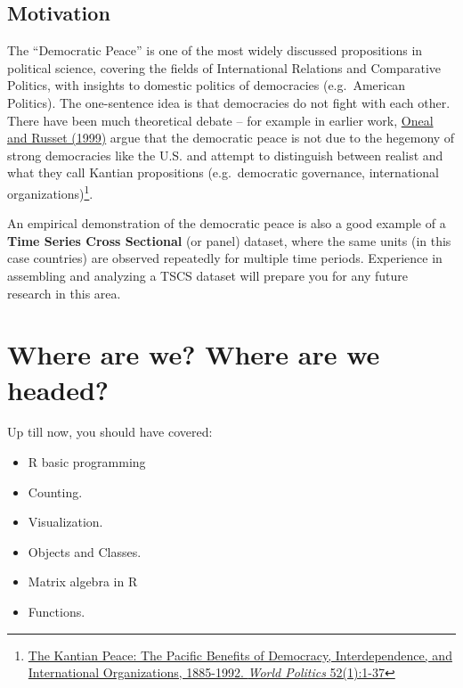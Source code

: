 \documentclass[
]{book}
\providecommand{\tightlist}{%
  \setlength{\itemsep}{0pt}\setlength{\parskip}{0pt}}
\theoremstyle{definition}
\theoremstyle{definition}
\theoremstyle{definition}
\theoremstyle{definition}
\theoremstyle{remark}
\begin{document}
\hypertarget{motivation}{%
\subsection*{Motivation}\label{motivation}}

The ``Democratic Peace'' is one of the most widely discussed propositions in political science, covering the fields of International Relations and Comparative Politics, with insights to domestic politics of democracies (e.g.~American Politics). The one-sentence idea is that democracies do not fight with each other. There have been much theoretical debate -- for example in earlier work, \href{https://blackboard.angelo.edu/bbcswebdav/institution/LFA/CSS/Course\%20Material/SEC6302/Readings/Lesson_3/Oneal-Russett.pdf}{Oneal and Russet (1999)} argue that the democratic peace is not due to the hegemony of strong democracies like the U.S. and attempt to distinguish between realist and what they call Kantian propositions (e.g.~democratic governance, international organizations)\footnote{\href{https://blackboard.angelo.edu/bbcswebdav/institution/LFA/CSS/Course\%20Material/SEC6302/Readings/Lesson_3/Oneal-Russett.pdf}{The Kantian Peace: The Pacific Benefits of Democracy, Interdependence, and International Organizations, 1885-1992. \emph{World Politics} 52(1):1-37}}.

An empirical demonstration of the democratic peace is also a good example of a \textbf{Time Series Cross Sectional} (or panel) dataset, where the same units (in this case countries) are observed repeatedly for multiple time periods. Experience in assembling and analyzing a TSCS dataset will prepare you for any future research in this area.

\hypertarget{where-are-we-where-are-we-headed-3}{%
\section*{Where are we? Where are we headed?}\label{where-are-we-where-are-we-headed-3}}

Up till now, you should have covered:

\begin{itemize}
\tightlist
\item
  R basic programming
\item
  Counting.
\item
  Visualization.
\item
  Objects and Classes.
\item
  Matrix algebra in R
\item
  Functions.
\end{itemize}
\end{document}

